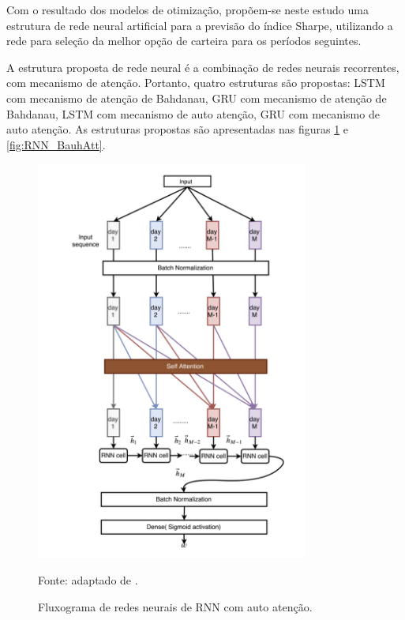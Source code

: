        \ipar Com o resultado dos modelos de otimização, propõem-se neste estudo uma estrutura de rede neural artificial para a previsão do índice Sharpe, utilizando a rede para seleção da melhor opção de carteira para os períodos seguintes. 

        \ipar A estrutura proposta de rede neural é a combinação de redes neurais recorrentes, com mecanismo de atenção. Portanto, quatro estruturas são propostas: LSTM com mecanismo de atenção de Bahdanau, GRU com mecanismo de atenção de Bahdanau, LSTM com mecanismo de auto atenção, GRU com mecanismo de auto atenção. As estruturas propostas são apresentadas nas figuras \ref{fig:RNN_SelfAtt} e  \ref{fig:RNN_BauhAtt}.


        \begin{figure}[htp]
            \centering
            \caption{Fluxograma de redes neurais de RNN com auto atenção.}
            \label{fig:RNN_SelfAtt}
            \includegraphics[width=0.8\textwidth]{./imagens/RNN_SelfAtt.png}
            \par \footnotesize Fonte: adaptado de .
        \end{figure}

